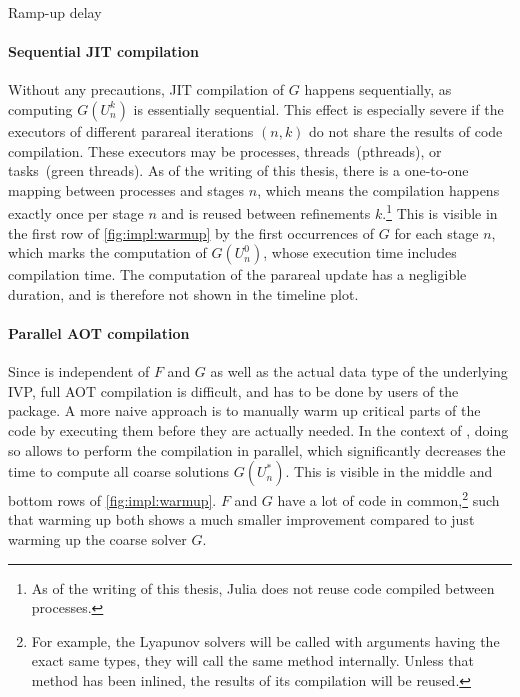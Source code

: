 \begin{table}[tb]
  \caption{Ramp-up delay}
\end{table}

\paragraph{Sequential \ac{JIT} compilation}

Without any precautions,
\ac{JIT} compilation of $G$ happens sequentially,
as computing $G(U_n^k)$ is essentially sequential.
This effect is especially severe if the executors of different parareal iterations $(n,k)$ do not share the results of code compilation.
These executors may be processes, threads~(pthreads), or tasks~(green threads).
As of the writing of this thesis,
there is a one-to-one mapping between processes and stages $n$,
which means the compilation happens exactly once per stage $n$ and is reused between refinements $k$.\footnote{%
  As of the writing of this thesis, Julia does not reuse code compiled between processes.
}
This is visible in the first row of \autoref{fig:impl:warmup}
by the first occurrences of $G$ for each stage $n$,
which marks the computation of $G(U_n^0)$,
whose execution time includes compilation time.
The computation of the parareal update has a negligible duration,
and is therefore not shown in the timeline plot.

\paragraph{Parallel \acs{AOT} compilation}

Since  is independent of $F$ and $G$ as well as the actual data type of the underlying \ac{IVP},
full \ac{AOT} compilation is difficult, and has to be done by users of the package.
A more naive approach is to manually warm up critical parts of the code by executing them before they are actually needed.
In the context of ,
doing so allows to perform the compilation in parallel,
which significantly decreases the time to compute all coarse solutions $G(U_n^*)$.
This is visible in the middle and bottom rows of \autoref{fig:impl:warmup}.
$F$ and $G$ have a lot of code in common,\footnote{%
  For example, the Lyapunov solvers will be called with arguments having the exact same types,
  \ie they will call the same method internally.
  Unless that method has been inlined, the results of its compilation will be reused.
}
such that warming up both shows a much smaller improvement compared to just warming up the coarse solver $G$.

